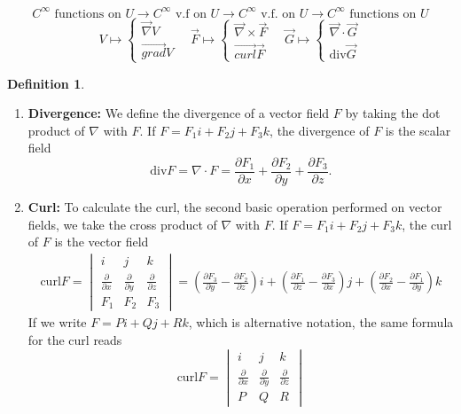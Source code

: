 \documentclass[12pt]{book}
\theoremstyle{definition}
\newtheorem{definition}{Definition}[section]
\theoremstyle{remark}
\begin{document}
  $$ C^\infty \text{ functions on }U \to C^\infty \text{ v.f on }U \to C^\infty \text{ v.f. on }U \to C^\infty \text{ functions on }U $$
  $$V \mapsto \left\{\begin{matrix}
    \vec{{\nabla}} {V} \\ \overrightarrow{grad} V   \end{matrix} \right. \quad \vec{{F}} \mapsto \left\{\begin{matrix}
    \vec{{\nabla}} \times \vec{{F}}  \\ \overrightarrow{curl} \vec{{F}}   \end{matrix} \right.\quad \vec{{G}} \mapsto \left\{\begin{matrix}
  \vec{{\nabla}} \cdot {\vec{{G}} } \\ \text{div} \vec{{G}} {}   \end{matrix} \right. $$
  \begin{definition} $ $
    \begin{enumerate}
      \item \textbf{Divergence:} We define the divergence of a vector field $F$ by taking the dot product of $\nabla$ with $F$. If $F = F_1i + F_2j + F_3k$, the divergence of $F$ is the scalar field
      $$\text{div} F = \nabla \cdot F = \frac{\partial {F_1}}{\partial {x}} + \frac{\partial {F_2}}{\partial {y}} + \frac{\partial {F_3}}{\partial {z}} . $$
      \item \textbf{Curl:} To calculate the curl, the second basic operation performed on vector fields, we take the cross product of $\nabla$ with $F$. If $F = F_1 i + F_2 j + F_3 k $, the curl of $F$ is the vector field 
      \begin{equation*}
        \begin{split}
          \text{curl} F= \begin{vmatrix}
        i & j& k \\ \frac{\partial {}}{\partial {x}} & \frac{\partial {}}{\partial {y}} & \frac{\partial {}}{\partial {z}} \\ F_1 & F_2 & F_3
          \end{vmatrix}  
          = \left( \frac{\partial {F_3}}{\partial {y}} - \frac{\partial {F_2}}{\partial {z}}  \right) i + \left( \frac{\partial {F_1}}{\partial {z}} - \frac{\partial {F_3}}{\partial {x}}  \right) j + \left( \frac{\partial {F_2}}{\partial {x}} - \frac{\partial {F_1}}{\partial {y}}  \right) k
        \end{split}
      \end{equation*}
      If we write $F = Pi + Qj + Rk$, which is alternative notation, the same formula for the curl reads
$$\text{curl} F= \begin{vmatrix}
        i & j& k \\ \frac{\partial {}}{\partial {x}} & \frac{\partial {}}{\partial {y}} & \frac{\partial {}}{\partial {z}} \\ P & Q & R
          \end{vmatrix} $$
      \end{enumerate}
  \end{definition} 
\end{document}
